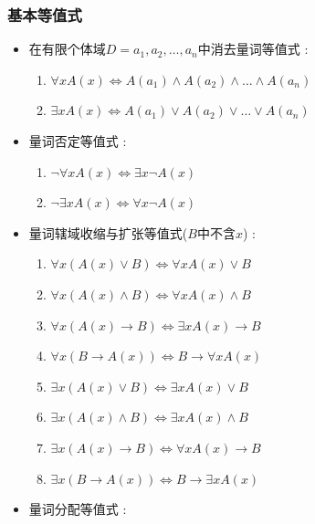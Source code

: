 \documentclass[UTF8,12pt]{ctexbook}
\begin{document}
{{{{    \subsubsection{基本等值式}{
      \begin{itemize}
        \item {
              在有限个体域$D = {a_1,a_2,\dots,a_n}$中消去量词等值式 :

              \begin{enumerate}
                \item $\forall x A(x) \Leftrightarrow A(a_1) \land A(a_2) \land \dots \land A(a_n)$
                \item $\exists x A(x) \Leftrightarrow A(a_1) \lor A(a_2) \lor \dots \lor A(a_n)$
              \end{enumerate}
              }
        \item {
              量词否定等值式 :

              \begin{enumerate}
                \item $\lnot\forall x A(x) \Leftrightarrow \exists x \lnot A(x)$
                \item $\lnot\exists x A(x) \Leftrightarrow \forall x \lnot A(x)$
              \end{enumerate}
              }
        \item {
              量词辖域收缩与扩张等值式($B$中不含$x$) :

              \begin{enumerate}
                \item $\forall x (A(x) \lor B) \Leftrightarrow \forall x A(x) \lor B$
                \item $\forall x (A(x) \land B) \Leftrightarrow \forall x A(x) \land B$
                \item $\forall x (A(x) \to B) \Leftrightarrow \exists x A(x) \to B$
                \item $\forall x (B \to A(x)) \Leftrightarrow B \to \forall x A(x)$
                \item $\exists x (A(x) \lor B) \Leftrightarrow \exists x A(x) \lor B$
                \item $\exists x (A(x) \land B) \Leftrightarrow \exists x A(x) \land B$
                \item $\exists x (A(x) \to B) \Leftrightarrow \forall x A(x) \to B$
                \item $\exists x (B \to A(x)) \Leftrightarrow B \to \exists x A(x)$
              \end{enumerate}
              }
        \item {
              量词分配等值式 :

}
\end{itemize}}}}}}
\end{document}
